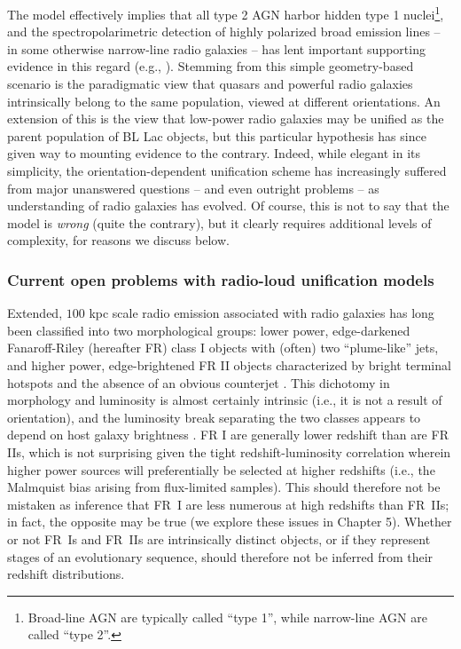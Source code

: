 The model effectively implies that all type 2 AGN harbor hidden type 1 nuclei\footnote{Broad-line AGN are typically called ``type 1'', while narrow-line AGN are called ``type 2''. }, 
and the spectropolarimetric detection of highly polarized broad emission lines -- in some otherwise narrow-line radio galaxies -- has lent important supporting evidence in this regard (e.g., \citealt{robinson87,cimatti97,ogle97,cohen99,zakamska05}).
Stemming from this simple geometry-based scenario is the 
paradigmatic view that quasars and powerful radio galaxies 
intrinsically belong to the same population, viewed at different orientations. 
An extension of this is the view that low-power radio 
galaxies may be unified as the parent population of BL Lac objects, but this particular
hypothesis has since given way to mounting evidence to the contrary. Indeed, 
while elegant in its simplicity,  the orientation-dependent unification scheme has increasingly suffered from major 
unanswered questions -- and even outright problems -- as understanding of radio galaxies has evolved. 
Of course, this is not to say that the model is {\it wrong} (quite the contrary), but it clearly 
requires additional levels of complexity, for reasons we discuss below. 


\subsubsection{{\bf Current open problems with radio-loud unification models}}


Extended, $100$ kpc scale radio emission associated with radio galaxies has
long been classified into two morphological groups: lower power, edge-darkened
Fanaroff-Riley (hereafter FR) class I objects with (often) two ``plume-like''
jets, and higher power, edge-brightened FR II objects characterized by bright
terminal hotspots and the absence of an obvious counterjet \citep{fanaroff74}.
This dichotomy in morphology and luminosity is almost certainly intrinsic
(i.e., it is not a result of orientation), and the luminosity break separating
the two classes appears to depend on host galaxy brightness
\citep{owen94,ledlow96}.  FR I are generally lower redshift than are FR IIs,
which is not surprising given the tight redshift-luminosity correlation wherein
higher power sources will preferentially be selected at higher redshifts (i.e.,
the Malmquist bias arising from flux-limited samples).  
This should therefore not be mistaken as inference that FR~I are less numerous at 
high redshifts than FR~IIs; in fact, the opposite may be true (we explore
these issues in Chapter 5). Whether or not FR~Is
and FR~IIs are intrinsically distinct objects, or if they represent stages of
an evolutionary sequence, should therefore not be inferred from their redshift
distributions. 


